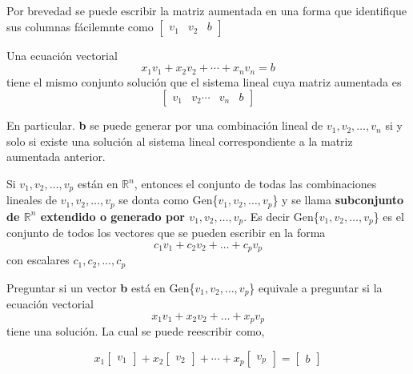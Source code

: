 \documentclass{article}
\begin{document}
Por brevedad se puede escribir la matriz aumentada en una forma que identifique sus columnas fácilemnte como $\begin{bmatrix} \textbf{$v_1$} & \textbf{$v_2$} & b \end{bmatrix}$

\begin{tcolorbox}[colback=green!20!white,colframe=green!80!black,title=Ecuación Vectorial y Sistema lineal]
    Una ecuación vectorial $$x_1\textbf{$v_1$} + x_2\textbf{$v_2$} + \dotsb + x_n\textbf{$v_n$} = \textbf{$b$}$$ tiene el mismo conjunto solución que el sistema lineal cuya matriz aumentada es $$\begin{bmatrix} \textbf{$v_1$} & \textbf{$v_2$} \dotsb & \textbf{$v_n$} & b \end{bmatrix}$$

    En particular. \textbf{b} se puede generar por una combinación lineal de $v_1, v_2,\dots, v_n$ si y solo si existe una solución al sistema lineal correspondiente a la matriz aumentada anterior.
\end{tcolorbox}

\begin{tcolorbox}[colback=blue!10!white,colframe=blue!60!black,title=Conjunto de Combinaciones Lineales]
    Si $v_1,v_2,\dots, v_p$ están en $\mathbb{R}^n$, entonces el conjunto de todas las combinaciones lineales de $v_1,v_2,\dots, v_p$ se donta como Gen\{$v_1,v_2,\dots, v_p$\} y se llama \textbf{subconjunto de $\mathbb{R}^n$ extendido o generado por $v_1,v_2,\dots, v_p$}. Es decir Gen\{$v_1,v_2,\dots, v_p$\} es el conjunto de todos los vectores que se pueden escribir en la forma $$c_1v_1 + c_2v_2 + \dots + c_pv_p$$
    con escalares $c_1,c_2,\dots, c_p$
\end{tcolorbox}

Preguntar si un vector \textbf{b} está en Gen\{$v_1,v_2,\dots, v_p$\} equivale a preguntar si la ecuación vectorial $$x_1v_1 + x_2v_2 + \dots + x_pv_p$$ tiene una solución. La cual se puede reescribir como, 

\begin{equation*}
    x_1 \begin{bmatrix} v_1 \end{bmatrix} 
    +x_2 \begin{bmatrix} v_2 \end{bmatrix}
    + \dotsb + x_p \begin{bmatrix} v_p \end{bmatrix}
    = \begin{bmatrix} b \end{bmatrix}
\end{equation*}
\end{document}
